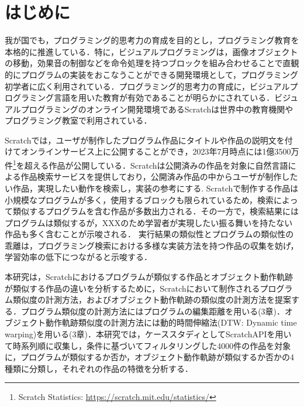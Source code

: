 \documentclass[T,J]{fose} %
\newcommand{\todo}[1]{\colorbox{yellow}{{\bf TODO}:}{\color{red} {\textbf{[#1]}}}}
\begin{document}
\section{はじめに}
我が国でも，プログラミング的思考力の育成を目的とし，プログラミング教育を本格的に推進している．特に，ビジュアルプログラミングは，画像オブジェクトの移動，効果音の制御などを命令処理を持つブロックを組み合わせることで直観的にプログラムの実装をおこなうことができる開発環境として，プログラミング初学者に広く利用されている．プログラミング的思考力の育成に，ビジュアルプログラミング言語を用いた教育が有効であることが明らかにされている\cite{Sugiura2008}\cite{Mori2011}．ビジュアルプログラミングのオンライン開発環境であるScratchは世界中の教育機関やプログラミング教室で利用されている．

Scratchでは，ユーザが制作したプログラム作品にタイトルや作品の説明文を付けてオンラインサービス上に公開することができ，2023年7月時点には1億3500万件\footnote{Scratch Statistics: \url{https://scratch.mit.edu/statistics/}}を超える作品が公開している．Scratchは公開済みの作品を対象に自然言語による作品検索サービスを提供しており，公開済み作品の中からユーザが制作したい作品，実現したい動作を検索し，実装の参考にする\cite{Resnick_2009}.
Scratchで制作する作品は小規模なプログラムが多く，使用するブロックも限られているため，検索によって類似するプログラムを含む作品が多数出力される．その一方で，検索結果にはプログラムは類似するが，XXXのため学習者が実現したい振る舞いを持たない作品も多く含むことが示唆される．
実行結果の類似性とプログラムの類似性の乖離は，プログラミング検索における多様な実装方法を持つ作品の収集を妨げ，学習効率の低下につながると示唆する．

本研究は，Scratchにおけるプログラムが類似する作品とオブジェクト動作軌跡が類似する作品の違いを分析するために，Scratchにおいて制作されるプログラム類似度の計測方法，およびオブジェクト動作軌跡の類似度の計測方法を提案する．プログラム類似度の計測方法にはプログラムの編集距離を用いる(3章)．オブジェクト動作軌跡類似度の計測方法には動的時間伸縮法(DTW: Dynamic time warping)を用いる(3章)．本研究では，ケーススタディとしてScratchAPIを用いて時系列順に収集し，条件に基づいてフィルタリングした4000件の作品を対象に，プログラムが類似するか否か，オブジェクト動作軌跡が類似するか否かの4種類に分類し，それぞれの作品の特徴を分析する．
\end{document}
